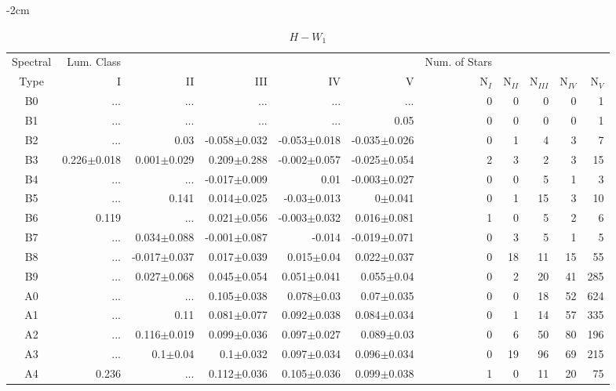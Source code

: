 \begin{table}[t]
\tiny
\centering
\caption{$H-W_{1}$}
\begin{center}
    \addtolength{\leftskip} {-2cm}
    \addtolength{\rightskip}{-2cm}
    \begin{tabular}{c|rrrrr|rrrrr}
    \toprule
    Spectral & Lum. Class & & & & & Num. of Stars & & & &  \\
    Type & I & II & III &  IV & V & N$_{I}$ & N$_{II}$ & N$_{III}$ & N$_{IV}$ & N$_{V}$ \\ \midrule
  
B0	&	 ...	&	 ...	&	 ...	&	 ...	&	 ...	&	0	&	0	&	0	&	0	&	1	\\
B1	&	 ...	&	 ...	&	 ...	&	 ...	&	0.05	&	0	&	0	&	0	&	0	&	1	\\
B2	&	 ...	&	0.03	&	-0.058$\pm$0.032	&	-0.053$\pm$0.018	&	-0.035$\pm$0.026	&	0	&	1	&	4	&	3	&	7	\\
B3	&	0.226$\pm$0.018	&	0.001$\pm$0.029	&	0.209$\pm$0.288	&	-0.002$\pm$0.057	&	-0.025$\pm$0.054	&	2	&	3	&	2	&	3	&	15	\\
B4	&	 ...	&	 ...	&	-0.017$\pm$0.009	&	0.01	&	-0.003$\pm$0.027	&	0	&	0	&	5	&	1	&	3	\\
B5	&	 ...	&	0.141	&	0.014$\pm$0.025	&	-0.03$\pm$0.013	&	0$\pm$0.041	&	0	&	1	&	15	&	3	&	10	\\
B6	&	0.119	&	 ...	&	0.021$\pm$0.056	&	-0.003$\pm$0.032	&	0.016$\pm$0.081	&	1	&	0	&	5	&	2	&	6	\\
B7	&	 ...	&	0.034$\pm$0.088	&	-0.001$\pm$0.087	&	-0.014	&	-0.019$\pm$0.071	&	0	&	3	&	5	&	1	&	5	\\
B8	&	 ...	&	-0.017$\pm$0.037	&	0.017$\pm$0.039	&	0.015$\pm$0.04	&	0.022$\pm$0.037	&	0	&	18	&	11	&	15	&	55	\\
B9	&	 ...	&	0.027$\pm$0.068	&	0.045$\pm$0.054	&	0.051$\pm$0.041	&	0.055$\pm$0.04	&	0	&	2	&	20	&	41	&	285	\\
A0	&	 ...	&	 ...	&	0.105$\pm$0.038	&	0.078$\pm$0.03	&	0.07$\pm$0.035	&	0	&	0	&	18	&	52	&	624	\\
A1	&	 ...	&	0.11	&	0.081$\pm$0.077	&	0.092$\pm$0.038	&	0.084$\pm$0.034	&	0	&	1	&	14	&	57	&	335	\\
A2	&	 ...	&	0.116$\pm$0.019	&	0.099$\pm$0.036	&	0.097$\pm$0.027	&	0.089$\pm$0.03	&	0	&	6	&	50	&	80	&	196	\\
A3	&	 ...	&	0.1$\pm$0.04	&	0.1$\pm$0.032	&	0.097$\pm$0.034	&	0.096$\pm$0.034	&	0	&	19	&	96	&	69	&	215	\\
A4	&	0.236	&	 ...	&	0.112$\pm$0.036	&	0.105$\pm$0.036	&	0.099$\pm$0.038	&	1	&	0	&	11	&	20	&	75	\\

\end{tabular}
\end{center}
\end{table}
